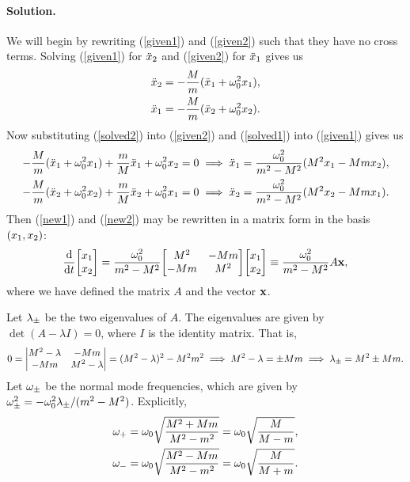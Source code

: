 \documentclass[11pt]{article}
\newcommand{\refeq}[1]{(\ref{#1})}
\newenvironment{solution}
{
    \paragraph{Solution.}
    \ignorespaces
}
{
    \bigskip
}
\begin{document}
\begin{solution}
	We will begin by rewriting \refeq{given1} and \refeq{given2} such that they have no cross terms.  Solving \refeq{given1} for $\ddot{x}_2$ and \refeq{given2} for $\ddot{x}_1$ gives us
	\begin{align}
		\ddot{x}_2 &= -\frac{M}{m} (\ddot{x}_1 + \omega_0^2 x_1), \label{solved2} \\
		\ddot{x}_1 &= -\frac{M}{m} (\ddot{x}_2 + \omega_0^2 x_2). \label{solved1}
	\end{align}
	Now substituting \refeq{solved2} into \refeq{given2} and \refeq{solved1} into \refeq{given1} gives us
	\begin{align}
		-\frac{M}{m} (\ddot{x}_1 + \omega_0^2 x_1) + \frac{m}{M} \ddot{x}_1 + \omega_0^2 x_2 = 0 &\implies \ddot{x}_1 = \frac{\omega_0^2}{m^2 - M^2} (M^2 x_1 - M m x_2), \label{new1} \\
		-\frac{M}{m} (\ddot{x}_2 + \omega_0^2 x_2) + \frac{m}{M} \ddot{x}_2 + \omega_0^2 x_1 = 0 &\implies \ddot{x}_2 = \frac{\omega_0^2}{m^2 - M^2} (M^2 x_2 - M m x_1). \label{new2}
	\end{align}
	Then \refeq{new1} and \refeq{new2} may be rewritten in a matrix form in the basis $(x_1, x_2)$:
	\begin{align}
		\dv{}{t} \mqty[ \xq \\ \xw ] = \frac{\omo^2}{m^2 - M^2} \mqty[ M^2 & -Mm \\ -Mm & M^2 ] \mqty[ \xq \\ \xw ] \equiv \frac{\omo^2}{m^2 - M^2} A \vx,
	\end{align}
	where we have defined the matrix $A$ and the vector $\mathbf{x}$.
	
	Let $\lambda_\pm$ be the two eigenvalues of $A$.  The eigenvalues are given by $\det(A - \lambda I) = 0$, where $I$ is the identity matrix.  That is,
	\begin{align}
		0 = \mdet{M^2 - \lambda & -Mm \\ -Mm & M^2 - \lambda} = (M^2 - \lambda)^2 - M^2 m^2 \implies M^2 - \lambda = \pm Mm \implies \lmpm = M^2 \pm Mm.
	\end{align}
	Let $\omega_\pm$ be the normal mode frequencies, which are given by $\omega_\pm^2 = -\omega_0^2 \lambda_\pm / (m^2 - M^2)$.  Explicitly,
	\begin{align}
		\omega_+ &= \omega_0 \sqrt{\frac{M^2 + Mm}{M^2 - m^2}} = \omega_0 \sqrt{\frac{M}{M - m}}, \\
		\omega_- &= \omega_0 \sqrt{\frac{M^2 - Mm}{M^2 - m^2}} = \omega_0 \sqrt{\frac{M}{M + m}}.
	\end{align}
\end{solution}
\end{document}
